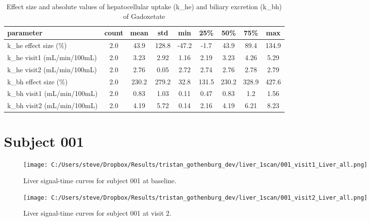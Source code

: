 \documentclass{epflreport}%
\begin{document}
\begin{table}[h!]%
\centering%
\begin{tabular}{lcccccccc}%
\hline%
parameter&count&mean&std&min&25\%&50\%&75\%&max\\%
\hline%
k\_he effect size (\%)&2.0&43.9&128.8&{-}47.2&{-}1.7&43.9&89.4&134.9\\%
k\_he visit1 (mL/min/100mL)&2.0&3.23&2.92&1.16&2.19&3.23&4.26&5.29\\%
k\_he visit2 (mL/min/100mL)&2.0&2.76&0.05&2.72&2.74&2.76&2.78&2.79\\%
k\_bh effect size (\%)&2.0&230.2&279.2&32.8&131.5&230.2&328.9&427.6\\%
k\_bh visit1 (mL/min/100mL)&2.0&0.83&1.03&0.11&0.47&0.83&1.2&1.56\\%
k\_bh visit2 (mL/min/100mL)&2.0&4.19&5.72&0.14&2.16&4.19&6.21&8.23\\%
\hline%
\end{tabular}%
\caption{Effect size and absolute values of hepatocellular uptake (k\_he) and biliary excretion (k\_bh) of Gadoxetate}%
\end{table}

%
\clearpage%
\section{Subject 001}%
\label{sec:Subject001}%


\begin{figure}[h!]%
\centering%
\texttt{[image: C:/Users/steve/Dropbox/Results/tristan\_gothenburg\_dev/liver\_1scan/001\_visit1\_Liver\_all.png]}%
\caption{Liver signal{-}time curves for subject 001 at baseline.}%
\end{figure}

%


\begin{figure}[h!]%
\centering%
\texttt{[image: C:/Users/steve/Dropbox/Results/tristan\_gothenburg\_dev/liver\_1scan/001\_visit2\_Liver\_all.png]}%
\caption{Liver signal{-}time curves for subject 001 at visit 2.}%
\end{figure}

%
\end{document}
